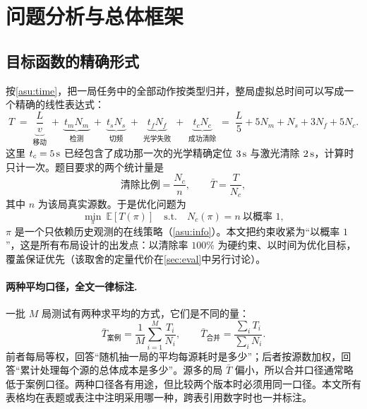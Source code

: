\section{问题分析与总体框架}\label{sec:analysis}

\subsection{目标函数的精确形式}

按\cref{asu:time}，把一局任务中的全部动作按类型归并，整局虚拟总时间可以写成一个精确的线性表达式：
\begin{equation}\label{eq:objective}
  T \;=\; \underbrace{\frac{L}{v}}_{\text{移动}}
        \;+\; \underbrace{t_m N_m}_{\text{检测}}
        \;+\; \underbrace{t_s N_s}_{\text{切频}}
        \;+\; \underbrace{t_f N_f}_{\text{光学失败}}
        \;+\; \underbrace{t_c N_c}_{\text{成功清除}}
  \;=\; \frac{L}{5}+5N_m+N_s+3N_f+5N_c .
\end{equation}
这里 $t_c=5\,\mathrm{s}$ 已经包含了成功那一次的光学精确定位 $3\,\mathrm{s}$ 与激光清除 $2\,\mathrm{s}$，计算时只计一次。题目要求的两个统计量是
\begin{equation}\label{eq:metric}
  \text{清除比例}=\frac{N_c}{n},\qquad
  \bar T=\frac{T}{N_c},
\end{equation}
其中 $n$ 为该局真实源数。于是优化问题为
\begin{equation}\label{eq:opt}
  \min_{\pi}\ \mathbb E\!\left[T(\pi)\right]
  \quad\text{s.t.}\quad N_c(\pi)=n\ \text{以概率 }1,
\end{equation}
$\pi$ 是一个只依赖历史观测的在线策略（\cref{asu:info}）。本文把约束收紧为“以概率 $1$”，这是所有布局设计的出发点：以清除率 $100\%$ 为硬约束、以时间为优化目标，覆盖保证优先（该取舍的定量代价在\cref{sec:eval}中另行讨论）。

\paragraph{两种平均口径，全文一律标注.} 一批 $M$ 局测试有两种求平均的方式，它们是不同的量：
\begin{equation}\label{eq:twomeans}
  \bar T_{\text{案例}}=\frac1M\sum_{i=1}^{M}\frac{T_i}{N_i},
  \qquad
  \bar T_{\text{合并}}=\frac{\sum_i T_i}{\sum_i N_i}.
\end{equation}
前者每局等权，回答“随机抽一局的平均每源耗时是多少”；后者按源数加权，回答“累计处理每个源的总体成本是多少”。源多的局 $\bar T$ 偏小，所以合并口径通常略低于案例口径。两种口径各有用途，但比较两个版本时必须用同一口径。本文所有表格均在表题或表注中注明采用哪一种，跨表引用数字时也一并标注。

